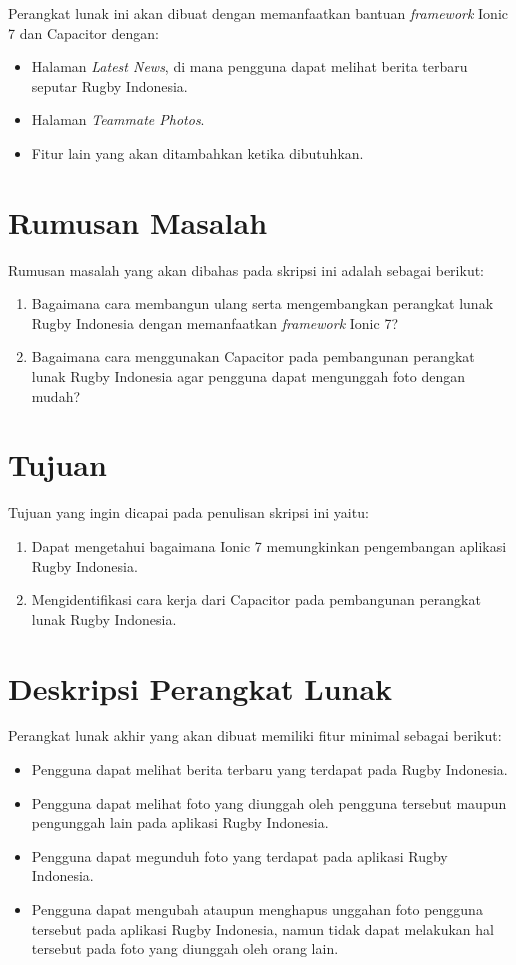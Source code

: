 \documentclass[a4paper,twoside]{article}
\begin{document}
Perangkat lunak ini akan dibuat dengan memanfaatkan bantuan {\it framework} Ionic 7 dan Capacitor dengan:

\begin{itemize}
    \item Halaman \textit{Latest News}, di mana pengguna dapat melihat berita terbaru seputar Rugby Indonesia.
    \item Halaman \textit{Teammate Photos}.
    \item Fitur lain yang akan ditambahkan ketika dibutuhkan.
\end{itemize}


\section{Rumusan Masalah}
Rumusan masalah yang akan dibahas pada skripsi ini adalah sebagai berikut:
\begin{enumerate}
    \item Bagaimana cara membangun ulang serta mengembangkan perangkat lunak Rugby Indonesia dengan memanfaatkan \textit{framework} Ionic 7?
    \item Bagaimana cara menggunakan Capacitor pada pembangunan perangkat lunak Rugby Indonesia agar pengguna dapat mengunggah foto dengan mudah?
\end{enumerate}

\section{Tujuan}
Tujuan yang ingin dicapai pada penulisan skripsi ini yaitu:
\begin{enumerate}
    \item Dapat mengetahui bagaimana Ionic 7 memungkinkan pengembangan aplikasi Rugby Indonesia.
    \item Mengidentifikasi cara kerja dari Capacitor pada pembangunan perangkat lunak Rugby Indonesia.
\end{enumerate}

\section{Deskripsi Perangkat Lunak}

Perangkat lunak akhir yang akan dibuat memiliki fitur minimal sebagai berikut:
\begin{itemize}
    \item Pengguna dapat melihat berita terbaru yang terdapat pada Rugby Indonesia.
    \item Pengguna dapat melihat foto yang diunggah oleh pengguna tersebut maupun pengunggah lain pada aplikasi Rugby Indonesia.
    \item Pengguna dapat megunduh foto yang terdapat pada aplikasi Rugby Indonesia.
    \item Pengguna dapat mengubah ataupun menghapus unggahan foto pengguna tersebut pada aplikasi Rugby Indonesia, namun tidak dapat melakukan hal tersebut pada foto yang diunggah oleh orang lain.
\end{itemize}
\end{document}
